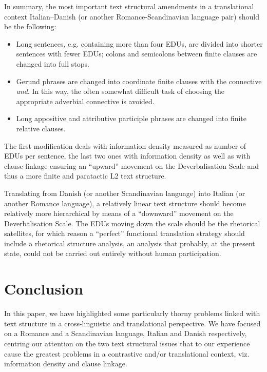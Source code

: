 \documentclass[output=paper]{LSP/langsci}
\begin{document}
In summary, the most important text structural amendments in a translational context Italian--Danish (or another Romance-Scandinavian language pair) should be the following:\\

\begin{itemize}
\item
Long sentences, e.g. containing more than four EDUs, are divided into shorter sentences with fewer EDUs; colons and semicolons between finite clauses are changed into full stops.
\item
Gerund phrases are changed into coordinate finite clauses with the connective \textit{and}. In this way, the often somewhat difficult task of choosing the appropriate adverbial connective is avoided.
\item
Long appositive and attributive participle phrases are changed into finite relative clauses. 
\end{itemize}

The first modification deals with information density measured as number of EDUs per sentence, the last two ones with information density as well as with clause linkage ensuring an ``upward'' movement on the Deverbalisation Scale and thus a more finite and paratactic L2 text structure.

Translating from Danish (or another Scandinavian language) into Italian (or another Romance language), a relatively linear text structure should become relatively more hierarchical by means of a ``downward'' movement on the Deverbalisation Scale. The EDUs moving down the scale should be the rhetorical satellites, for which reason a ``perfect'' functional translation strategy should include a rhetorical structure analysis, an analysis that probably, at the present state, could not be carried out entirely without human participation. 

\section{Conclusion}\label{sec:korzen:5}
\largerpage
In this paper, we have highlighted some particularly thorny problems linked with text structure in a cross-linguistic and translational perspective. We have focused on a Romance and a Scandinavian language, Italian and Danish respectively, centring our attention on the two text structural issues that to our experience cause the greatest problems in a contrastive and/or translational context, viz. information density and clause linkage. 
\end{document}
